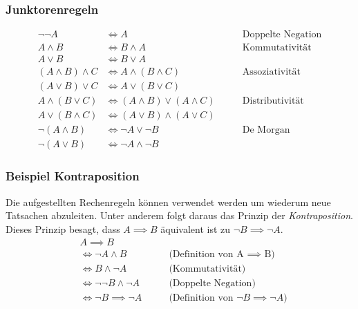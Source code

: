 	\subsubsection{Junktorenregeln}
	\begin{align*}
		\neg\neg A &\iff A \qquad &\text{Doppelte Negation} \\
		A \land B &\iff B \land A 
		\qquad &\text{Kommutativität} \\
		A \lor B &\iff B \lor A \\
		(A \land B) \land C &\iff A \land (B \land C) 
		\qquad &\text{Assoziativität} \\
		(A \lor B) \lor C &\iff A \lor (B \lor C) \\
		A \land (B \lor C) &\iff (A \land B) \lor (A \land C) 
		\qquad &\text{Distributivität} \\
		A \lor (B \land C) &\iff (A \lor B) \land (A \lor C) \\
		\neg (A \land B) &\iff \neg A \lor \neg B 
		\qquad &\text{De Morgan} \\
		\neg (A \lor B) &\iff \neg A \land \neg B
	\end{align*}
	
	\subsubsection{Beispiel Kontraposition}
	Die aufgestellten Rechenregeln können verwendet werden 
	um wiederum neue Tatsachen abzuleiten. 
	Unter anderem folgt daraus das Prinzip der \textit{Kontraposition}. 
	Dieses Prinzip besagt, dass $A \implies B$ 
	äquivalent ist zu $\neg B \implies \neg A$.
	\begin{align*}
		&A \implies B \\
		&\iff \neg A \land B \qquad &\text{(Definition von A 
		$\implies$ B)} \\
		&\iff B \land \neg A \qquad &\text{(Kommutativität)} \\
		&\iff \neg\neg B \land \neg A \qquad 
		&\text{(Doppelte Negation)} \\
		&\iff \neg B \implies \neg A \qquad &\text{(Definition von 
		$\neg B \implies \neg A $)}
	\end{align*}

